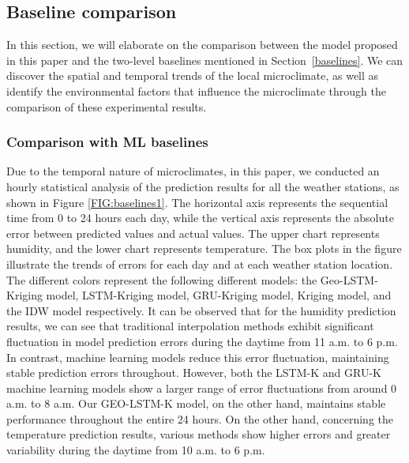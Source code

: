 \documentclass[a4paper,fleqn]{cas-sc}
\begin{document}
\subsection{Baseline comparison}

In this section, we will elaborate on the comparison between the model proposed in this paper and the two-level baselines mentioned in Section~\ref{baselines}. We can discover the spatial and temporal trends of the local microclimate, as well as identify the environmental factors that influence the microclimate through the comparison of these experimental results.

\subsubsection{Comparison with ML baselines}

Due to the temporal nature of microclimates, in this paper, we conducted an hourly statistical analysis of the prediction results for all the weather stations, as shown in Figure \ref{FIG:baselines1}. The horizontal axis represents the sequential time from 0 to 24 hours each day, while the vertical axis represents the absolute error between predicted values and actual values. The upper chart represents humidity, and the lower chart represents temperature. The box plots in the figure illustrate the trends of errors for each day and at each weather station location. The different colors represent the following different models: the Geo-LSTM-Kriging model, LSTM-Kriging model, GRU-Kriging model, Kriging model, and the IDW model respectively. It can be observed that for the humidity prediction results, we can see that traditional interpolation methods exhibit significant fluctuation in model prediction errors during the daytime from 11 a.m. to 6 p.m. In contrast, machine learning models reduce this error fluctuation, maintaining stable prediction errors throughout. However, both the LSTM-K and GRU-K machine learning models show a larger range of error fluctuations from around 0 a.m. to 8 a.m. Our GEO-LSTM-K model, on the other hand, maintains stable performance throughout the entire 24 hours. On the other hand, concerning the temperature prediction results, various methods show higher errors and greater variability during the daytime from 10 a.m. to 6 p.m. 
\end{document}
